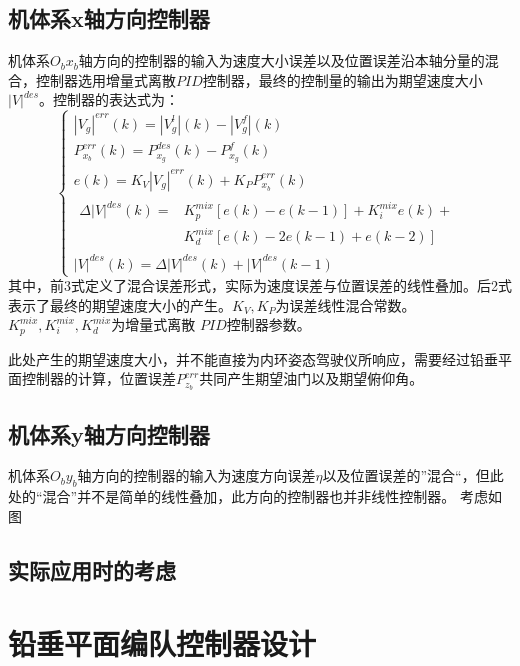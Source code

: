\subsection{机体系x轴方向控制器}
机体系$O_bx_b$轴方向的控制器的输入为速度大小误差以及位置误差沿本轴分量的混合，控制器选用增量式离散$PID$控制器，最终的控制量的输出为期望速度大小${|V|}^{des}$。控制器的表达式为：
\begin{equation}
    \left\{
    \begin{array}{l}
        |V_g|^{err}(k)=|V_g^{l}|(k)-|V_g^{f}|(k)\\
        P_{x_b}^{err}(k)=P_{x_g}^{des}(k)-P_{x_g}^{f}(k)\\
        e(k)=K_V|V_g|^{err}(k)+K_PP_{x_b}^{err}(k)\\
        \begin{aligned}
        \Delta{|V|}^{des}(k)=&K_{p}^{mix}[e(k)-e(k-1)]+K_{i}^{mix}e(k)+\\
        &K_{d}^{mix}[e(k)-2e(k-1)+e(k-2)]
        \end{aligned}
        \\
        {|V|}^{des}(k)=\Delta{|V|}^{des}(k)+{|V|}^{des}(k-1)
    \end{array}
    \right .
    \label{xb_vel_gen_equ}
\end{equation}
其中，前3式定义了混合误差形式，实际为速度误差与位置误差的线性叠加。后2式表示了最终的期望速度大小的产生。$K_V,K_P$为误差线性混合常数。$K_{p}^{mix},K_{i}^{mix},K_{d}^{mix}$为增量式离散
$PID$控制器参数。

此处产生的期望速度大小，并不能直接为内环姿态驾驶仪所响应，需要经过铅垂平面控制器的计算，位置误差$P_{z_b}^{err}$共同产生期望油门以及期望俯仰角。
\subsection{机体系y轴方向控制器}
机体系$O_by_b$轴方向的控制器的输入为速度方向误差$\eta$以及位置误差的”混合“，但此处的“混合”并不是简单的线性叠加，此方向的控制器也并非线性控制器。
考虑如图
\subsection{实际应用时的考虑}

\section{铅垂平面编队控制器设计}
